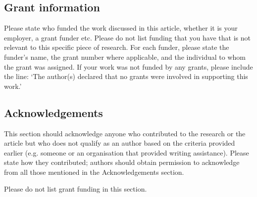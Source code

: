 \documentclass[10pt,a4paper,twocolumn]{article}
\begin{document}
\subsection*{Grant information}
Please state who funded the work discussed in this article, whether it is your employer,
a grant funder etc. Please do not list funding that you have that is not relevant to this
specific piece of research. For each funder, please state the funder’s name, the grant
number where applicable, and the individual to whom the grant was assigned.
If your work was not funded by any grants, please include the line: ‘The author(s)
declared that no grants were involved in supporting this work.’

\subsection*{Acknowledgements}
This section should acknowledge anyone who contributed to the research or the
article but who does not qualify as an author based on the criteria provided earlier
(e.g. someone or an organisation that provided writing assistance). Please state how
they contributed; authors should obtain permission to acknowledge from all those
mentioned in the Acknowledgements section.

Please do not list grant funding in this section.


{\small
}









\end{document}
